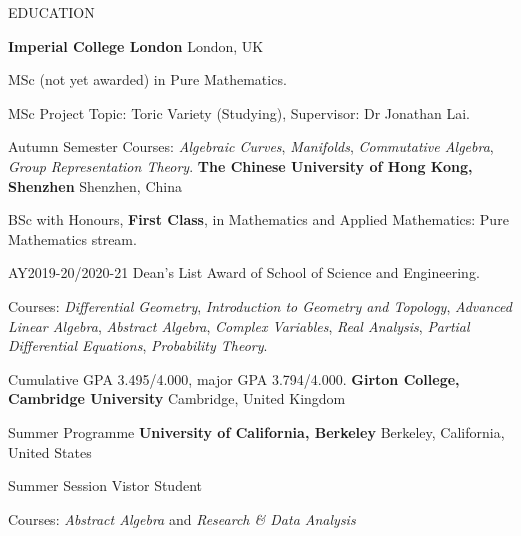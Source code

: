 \begin{rubric}{EDUCATION}

\entry*[2021 - 2022]
	\textbf{Imperial College London} \hfill London, UK \par
	MSc (not yet awarded) in Pure Mathematics. \par
	MSc Project Topic: Toric Variety (Studying), Supervisor: Dr Jonathan Lai. \par
	Autumn Semester Courses: \textit{Algebraic Curves}, \textit{Manifolds}, \textit{Commutative Algebra}, \textit{Group Representation Theory}.
\entry*[2017 - 2021]
	\textbf{The Chinese University of Hong Kong, Shenzhen} \hfill Shenzhen, China \par
	BSc with Honours, \textbf{First Class}, in Mathematics and Applied Mathematics: Pure Mathematics stream. \par
	AY2019-20/2020-21 Dean's List Award of School of Science and Engineering. \par
	Courses: \textit{Differential Geometry}, \textit{Introduction to Geometry and Topology}, \textit{Advanced Linear Algebra}, \textit{Abstract Algebra}, \textit{Complex Variables}, \textit{Real Analysis}, \textit{Partial Differential Equations}, \textit{Probability Theory}. \par
	Cumulative GPA 3.495/4.000, major GPA 3.794/4.000.
\entry*[Summer 2019]
	\textbf{Girton College, Cambridge University} \hfill Cambridge, United Kingdom \par
	Summer Programme
\entry*[Summer 2018]
	\textbf{University of California, Berkeley} \hfill Berkeley, California, United States \par
	Summer Session Vistor Student \par
	Courses: \textit{Abstract Algebra} and \textit{Research \& Data Analysis}
\end{rubric}
